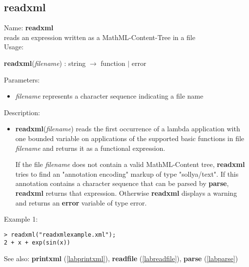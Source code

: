 \subsection{readxml}
\label{labreadxml}
\noindent Name: \textbf{readxml}\\
reads an expression written as a MathML-Content-Tree in a file\\

\noindent Usage: 
\begin{center}
\textbf{readxml}(\emph{filename}) : \textsf{string} $\rightarrow$ \textsf{function} $|$ \textsf{error}\\
\end{center}
Parameters: 
\begin{itemize}
\item \emph{filename} represents a character sequence indicating a file name
\end{itemize}
\noindent Description: \begin{itemize}

\item \textbf{readxml}(\emph{filename}) reads the first occurrence of a lambda
   application with one bounded variable on applications of the supported
   basic functions in file \emph{filename} and returns it as a \sollya
   functional expression.
    
   If the file \emph{filename} does not contain a valid MathML-Content tree,
   \textbf{readxml} tries to find an "annotation encoding" markup of type
   "sollya/text". If this annotation contains a character sequence
   that can be parsed by \textbf{parse}, \textbf{readxml} returns that expression.  Otherwise
   \textbf{readxml} displays a warning and returns an \textbf{error} variable of type
   \textsf{error}.
\end{itemize}
\noindent Example 1: 
\begin{center}\begin{minipage}{15cm}\begin{Verbatim}[frame=single]
> readxml("readxmlexample.xml");
2 + x + exp(sin(x))
\end{Verbatim}
\end{minipage}\end{center}
See also: \textbf{printxml} (\ref{labprintxml}), \textbf{readfile} (\ref{labreadfile}), \textbf{parse} (\ref{labparse})
